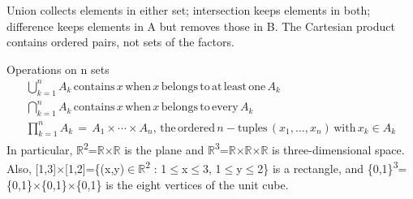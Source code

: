 \documentclass[11pt]{article}
\begin{document}
\begin{keepsection}
\begin{keepsection}
\begin{center}
\begin{minipage}[t]{0.223\linewidth}
\begin{tikzpicture}[line join=round]
\end{tikzpicture}\par{}\end{minipage}\hfill
\begin{minipage}[t]{0.223\linewidth}\centering
{}\par{}\end{minipage}
\end{center}

Union collects elements in either set; intersection keeps elements in both; difference keeps elements in A but removes those in B. The Cartesian product contains ordered pairs, not sets of the factors.

\begin{equationcard}{Operations on n sets}
\[ \begin{gathered} \bigcup_{{k}=1}^{{n}} {A}_{{k}}\, \text{contains}\, {x}\, \text{when}\, {x}\, \text{belongs}\, \text{to}\, \text{at}\, \text{least}\, \text{one}\, {A}_{{k}} \\ \bigcap_{{k}=1}^{{n}} {A}_{{k}}\, \text{contains}\, {x}\, \text{when}\, {x}\, \text{belongs}\, \text{to}\, \text{every}\, {A}_{{k}} \\ \prod_{{k}=1}^{{n}} {A}_{{k}}\, =\, {A}_{1}\times ⋯\times {A}_{{n}},\, \text{the}\, \text{ordered}\, {n}-\text{tuples}\, ({x}_{1},…,{x}_{{n}})\, \text{with}\, {x}_{{k}}\in {A}_{{k}} \end{gathered} \]
{\small In particular, \ensuremath{\mathbb{R}}\textsuperscript{2}=\ensuremath{\mathbb{R}}\ensuremath{\times}\ensuremath{\mathbb{R}} is the plane and \ensuremath{\mathbb{R}}\textsuperscript{3}=\ensuremath{\mathbb{R}}\ensuremath{\times}\ensuremath{\mathbb{R}}\ensuremath{\times}\ensuremath{\mathbb{R}} is three-dimensional space. Also, [1,3]\ensuremath{\times}[1,2]=\{(x,y)\ensuremath{\in}\ensuremath{\mathbb{R}}\textsuperscript{2} : 1\ensuremath{\leq}x\ensuremath{\leq}3, 1\ensuremath{\leq}y\ensuremath{\leq}2\} is a rectangle, and \{0,1\}\textsuperscript{3}=\{0,1\}\ensuremath{\times}\{0,1\}\ensuremath{\times}\{0,1\} is the eight vertices of the unit cube.}
\end{equationcard}


\end{keepsection}
\end{keepsection}
\end{document}
